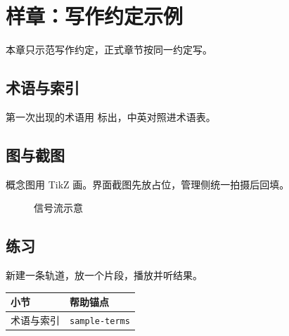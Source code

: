 \chapter{样章：写作约定示例}
\label{ch:sample}

本章只示范写作约定，正式章节按同一约定写。

\section{术语与索引}
第一次出现的术语用  标出，中英对照进术语表。

\section{图与截图}
概念图用 TikZ 画。界面截图先放占位，管理侧统一拍摄后回填。

\begin{figure}[htbp]
  \centering
  \caption{信号流示意}
  \label{fig:signal-flow-sample}
\end{figure}


\section{练习}
\begin{exercise}
新建一条轨道，放一个片段，播放并听结果。
\end{exercise}

\begin{helpmapping}
\begin{longtable}{ll}
\toprule
小节 & 帮助锚点 \\
\midrule
术语与索引 & \texttt{sample-terms} \\
\bottomrule
\end{longtable}
\end{helpmapping}
